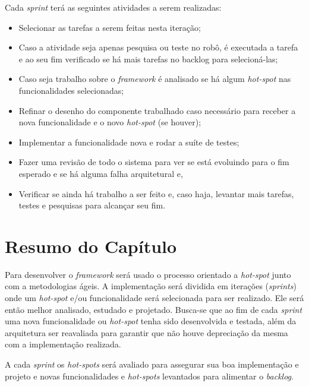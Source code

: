 Cada \textit{sprint} terá as seguintes atividades a serem realizadas: 
\begin{itemize}
  \item Selecionar as tarefas a serem feitas nesta iteração;
  \item Caso a atividade seja apenas pesquisa ou teste no robô, é executada a tarefa e ao seu fim verificado se há mais tarefas no backlog para selecioná-las;
  \item Caso seja trabalho sobre o \textit{framework} é analisado se há algum \textit{hot-spot} nas funcionalidades selecionadas;
  \item Refinar o desenho do componente trabalhado caso necessário para receber a nova funcionalidade e o novo \textit{hot-spot} (se houver);
  \item Implementar a funcionalidade nova e rodar a suíte de testes;
  \item Fazer uma revisão de todo o sistema para ver se está evoluindo para o fim esperado e se há alguma falha arquitetural e,
  \item Verificar se ainda há trabalho a ser feito e, caso haja, levantar mais tarefas, testes e pesquisas para alcançar seu fim.
\end{itemize} 

\section{Resumo do Capítulo}

Para desenvolver o \textit{framework} será usado o processo orientado a \textit{hot-spot} junto com a metodologias ágeis. A implementação será dividida em iterações (\textit{sprints}) onde um \textit{hot-spot} e/ou funcionalidade será selecionada para ser realizado. Ele será então melhor analisado, estudado e projetado. Busca-se que ao fim de cada \textit{sprint} uma nova funcionalidade ou \textit{hot-spot} tenha sido desenvolvida e testada, além da arquitetura ser reavaliada para garantir que não houve depreciação da mesma com a implementação realizada.

A cada \textit{sprint} os \textit{hot-spots} será avaliado para assegurar sua boa implementação e projeto e novas funcionalidades e \textit{hot-spots} levantados para alimentar o \textit{backlog}.